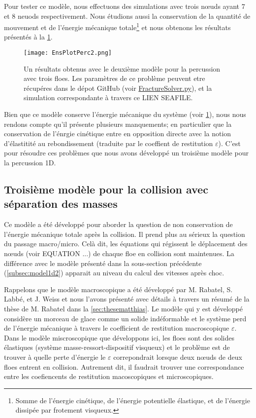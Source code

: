 Pour tester ce modèle, nous effectuons des simulations avec trois n\oe{}uds ayant $7$ et $8$ neuods respectivement. Nous étudions aussi la conservation de la quantité de mouvement et de l'énergie mécanique totale\footnote{Somme de l'énergie cinétique, de l'énergie potentielle élastique, et de l'énergie dissipée par frotement visqueux.} et nous obtenons les résultats présentés à la \cref{fig:frac1d4}.
\begin{figure}[!h]
    \centering
    \texttt{[image: EnsPlotPerc2.png]}
    \caption{Un résultats obtenus avec le deuxième modèle pour la percussion avec trois floes. Les paramètres de ce problème peuvent etre récupéres dans le dépot GitHub (voir \href{https://github.com/desmond-rn/ice-floes/blob/master/code/simu1D/FractureSolver.py}{FractureSolver.py}), et la simulation correspondante à travers ce LIEN SEAFILE.}
    \label{fig:frac1d4}
\end{figure}
Bien que ce modèle conserve l'énergie mécanique du système (voir \cref{fig:frac1d4}), nous nous rendons compte qu'il présente plusieurs manquements; en particulier que la conservation de l'énrgie cinétique entre en opposition directe avec la notion d'élastitité au rebondissement (traduite par le coeffient de restitution $\varepsilon$). C'est pour résoudre ces problèmes que nous avons développé un troisième modèle pour la percussion 1D.





\subsection{Troisième modèle pour la collision avec séparation des masses}
\label{subsubsec:troisiemecol}

Ce modèle a été développé pour aborder la question de non conservation de l'énergie mécanique totale après la collision.
Il prend plus au sérieux la question du passage macro/micro. Celà dit, les équations qui régissent le déplacement des n\oe{}uds (voir EQUATION ...) de chaque floe en collision sont maintenues. La différence avec le modèle présenté dans la sous-section précédente (\cref{subsec:model1d2}) apparait au niveau du calcul des vitesses après choc.

Rappelons que le modèle macroscopique a été développé par M. Rabatel, S. Labbé, et J. Weiss \parencite{rabatel2015dynamics} et nous l'avons présenté avec détails à travers un résumé de la thèse de M. Rabatel \parencite{rabatel2015thesis} dans la \cref{sec:thesematthias}. Le modèle qui y est développé considère un morceau de glace comme un solide indéformable et le système perd de l'énergie mécanique à travers le coefficient de restitution macroscopique $\varepsilon$. Dans le modèle miscroscopique que développons ici, les floes sont des solides élastiques (système masse-ressort-dispositif visqueux) et le problème est de trouver à quelle perte d'énergie le $\varepsilon$ correpondrait lorsque deux n\oe{}uds de deux floes entrent en collision. Autrement dit, il faudrait trouver une correspondance entre les coefiencents de restitution macoscopiques et microscopiques.

